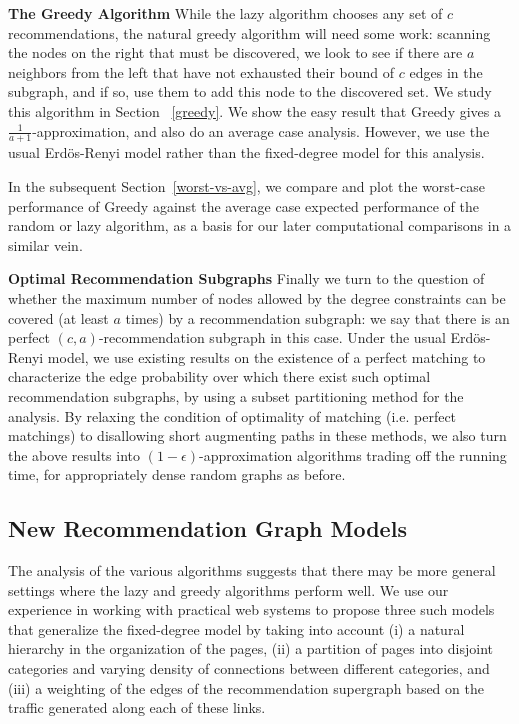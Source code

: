 {\bf The Greedy Algorithm}
While the lazy algorithm chooses any set of $c$ recommendations, the natural
greedy algorithm will need some work: scanning the nodes on the right that must
be discovered, we look to see if there are $a$ neighbors from the left that have
not exhausted their bound of $c$ edges in the subgraph, and if so, use them to
add this node to the discovered set. We study this algorithm in Section
~\ref{greedy}. We show the easy result that Greedy gives a 
$\frac{1}{a+1}$-approximation, and also do an average case analysis. However, we
use the usual Erd\"os-Renyi model rather than the fixed-degree model for this
analysis.

In the subsequent Section~\ref{worst-vs-avg}, we compare and plot the worst-case
performance of Greedy against the average case expected performance of the random
or lazy algorithm, as a basis for our later computational comparisons in a
similar vein. \vs

{\bf Optimal Recommendation Subgraphs}
Finally we turn to the question of whether the maximum number of nodes allowed
by the degree constraints can be covered (at least $a$ times) by a recommendation
subgraph: we say that there is an perfect $(c,a)$-recommendation subgraph in this
case. Under the usual Erd\"os-Renyi model, we use existing results on the
existence of a perfect matching to characterize the edge probability over which
there exist such optimal recommendation subgraphs, by using a subset partitioning
method for the analysis. By relaxing the condition of optimality of matching (i.e.
perfect matchings) to disallowing short augmenting paths in these methods, we also
turn the above results into $(1-\epsilon)$-approximation algorithms trading off
the running time, for appropriately dense random graphs as before. \vs

\subsection{New Recommendation Graph Models}
The analysis of the various algorithms suggests that there may be more general
settings where the lazy and greedy algorithms perform well. We use our
experience in working with practical web systems to propose three such models
that generalize the fixed-degree model by taking into account (i) a natural
hierarchy in the organization of the pages, (ii) a partition of pages into
disjoint categories and varying density of connections between different
categories, and (iii) a weighting of the edges of the recommendation supergraph
based on the traffic generated along each of these links. \vs

